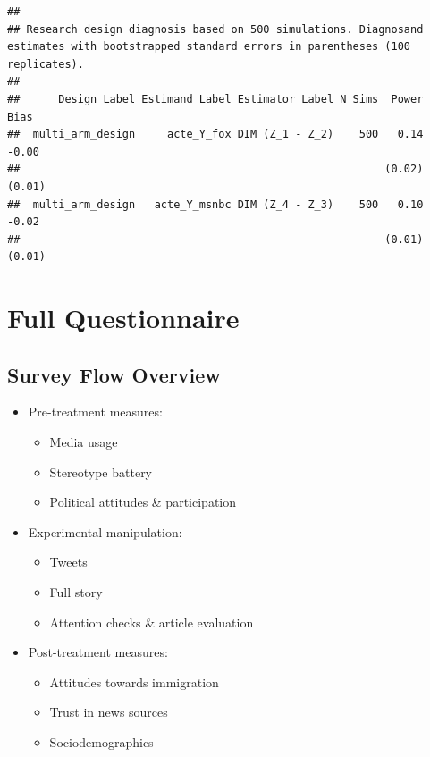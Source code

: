 \documentclass[
]{article}
\providecommand{\tightlist}{%
  \setlength{\itemsep}{0pt}\setlength{\parskip}{0pt}}
\begin{document}
\begin{verbatim}
## 
## Research design diagnosis based on 500 simulations. Diagnosand estimates with bootstrapped standard errors in parentheses (100 replicates).
## 
##      Design Label Estimand Label Estimator Label N Sims  Power   Bias
##  multi_arm_design     acte_Y_fox DIM (Z_1 - Z_2)    500   0.14  -0.00
##                                                         (0.02) (0.01)
##  multi_arm_design   acte_Y_msnbc DIM (Z_4 - Z_3)    500   0.10  -0.02
##                                                         (0.01) (0.01)
\end{verbatim}

\hypertarget{full-questionnaire}{%
\section{Full Questionnaire}\label{full-questionnaire}}

\hypertarget{survey-flow-overview}{%
\subsection{Survey Flow Overview}\label{survey-flow-overview}}

\begin{itemize}
\tightlist
\item
  Pre-treatment measures:

  \begin{itemize}
  \tightlist
  \item
    Media usage
  \item
    Stereotype battery
  \item
    Political attitudes \& participation
  \end{itemize}
\item
  Experimental manipulation:

  \begin{itemize}
  \tightlist
  \item
    Tweets
  \item
    Full story
  \item
    Attention checks \& article evaluation
  \end{itemize}
\item
  Post-treatment measures:

  \begin{itemize}
  \tightlist
  \item
    Attitudes towards immigration
  \item
    Trust in news sources
  \item
    Sociodemographics
  \end{itemize}
\end{itemize}
\end{document}

